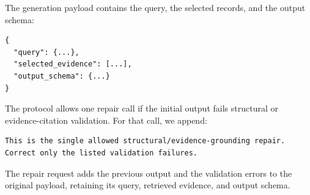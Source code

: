 The generation payload contains the query, the selected records, and the output schema:

\begin{lstlisting}
{
  "query": {...},
  "selected_evidence": [...],
  "output_schema": {...}
}
\end{lstlisting}

The protocol allows one repair call if the initial output fails structural or evidence-citation validation. For that call, we append:

\begin{lstlisting}
This is the single allowed structural/evidence-grounding repair.
Correct only the listed validation failures.
\end{lstlisting}

The repair request adds the previous output and the validation errors to the original payload, retaining its query, retrieved evidence, and output schema.
